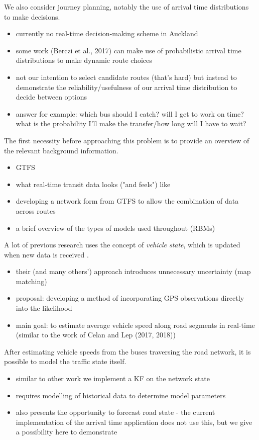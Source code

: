 We also consider journey planning, notably the use of arrival time distributions to make decisions.
\begin{itemize}
\item currently no real-time decision-making scheme in Auckland
\item some work (Berczi et al., 2017) can make use of probabilistic arrival time distributions to make dynamic route choices
\item not our intention to select candidate routes (that's hard) but instead to demonstrate the reliability/usefulness of our arrival time distribution to decide between options
\item answer for example: which bus should I catch? will I get to work on time? what is the probability I'll make the transfer/how long will I have to wait?
\end{itemize}

The first necessity before approaching this problem is to provide an overview of the relevant background information.
\begin{itemize}
\item GTFS
\item what real-time transit data looks ("and feels") like
\item developing a network form from GTFS to allow the combination of data across routes
\item a brief overview of the types of models used throughout (RBMs)
\end{itemize}

A lot of previous research uses the concept of \emph{vehicle state}, which is updated when new data is received \citep{Cathey_2003}.
\begin{itemize}
\item their (and many others') approach introduces unnecessary uncertainty (map matching)
\item proposal: developing a method of incorporating GPS observations directly into the likelihood
\item main goal: to estimate average vehicle speed along road segments in real-time (similar to the work of Celan and Lep (2017, 2018))
\end{itemize}

After estimating vehicle speeds from the buses traversing the road network, it is possible to model the traffic state itself.
\begin{itemize}
\item similar to other work we implement a KF on the network state
\item requires modelling of historical data to determine model parameters
\item also presents the opportunity to forecast road state - the current implementation of the arrival time application does not use this, but we give a possibility here to demonstrate
\end{itemize}


